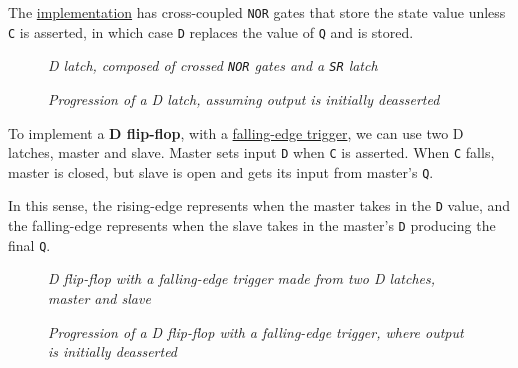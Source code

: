 \documentclass[11pt]{article}
\begin{document}
The \hyperref[]{implementation} has cross-coupled \texttt{NOR} gates that store the state value unless \texttt{C} is asserted, in which case \texttt{D} replaces the value of \texttt{Q} and is stored.

\pagebreak

\begin{figure}[htbp]
    \centering
    \caption{\textit{D latch, composed of crossed \texttt{NOR} gates and a \texttt{SR} latch}}
    \vspace{1em}
    \centering
    \caption{\textit{Progression of a D latch, assuming output is initially deasserted}}
\end{figure}

To implement a \textbf{D flip-flop}, with a \underline{falling-edge trigger}, we can use two D latches, master and slave. Master sets input \texttt{D} when \texttt{C} is asserted. When \texttt{C} falls, master is closed, but slave is open and gets its input from master's \texttt{Q}.

In this sense, the rising-edge represents when the master takes in the \texttt{D} value, and the falling-edge represents when the slave takes in the master's \texttt{D} producing the final \texttt{Q}.

\begin{figure}[htbp]
    \centering
    \caption{\textit{D flip-flop with a falling-edge trigger made from two D latches, master and slave}}
    \vspace{1.5em}
    \centering
    \caption{\textit{Progression of a D flip-flop with a falling-edge trigger, where output is initially deasserted}}
\end{figure}
\end{document}
